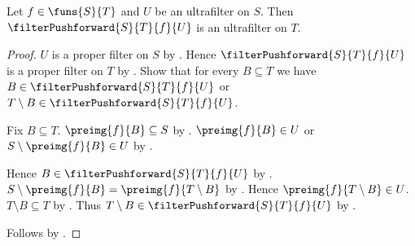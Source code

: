\begin{theorem}\label{filter_pushforward_preserves_ultrafilters}
    Let $f\in\funs{S}{T}$ and $U$ be an ultrafilter on $S$.
    Then $\filterPushforward{S}{T}{f}{U}$ is an ultrafilter on $T$.
\end{theorem}
\begin{proof}
    $U$ is a proper filter on $S$ by
        .
    Hence $\filterPushforward{S}{T}{f}{U}$ is a proper filter on $T$ by
        .
    Show that for every $B\subseteq T$ we have
        $B\in\filterPushforward{S}{T}{f}{U}$ or
        $T\setminus B\in\filterPushforward{S}{T}{f}{U}$.
    \begin{subproof}
        Fix $B\subseteq T$.
        $\preimg{f}{B}\subseteq S$ by
            .
        $\preimg{f}{B}\in U$ or
            $S\setminus\preimg{f}{B}\in U$ by
            .
        \begin{byCase}
            Hence $B\in\filterPushforward{S}{T}{f}{U}$ by
                .
            $S\setminus\preimg{f}{B}=\preimg{f}{T\setminus B}$ by
                .
            Hence $\preimg{f}{T\setminus B}\in U$.
            $T\setminus B\subseteq T$ by .
            Thus $T\setminus B\in
                \filterPushforward{S}{T}{f}{U}$ by
                .
        \end{byCase}
    \end{subproof}
    Follows by .
\end{proof}

